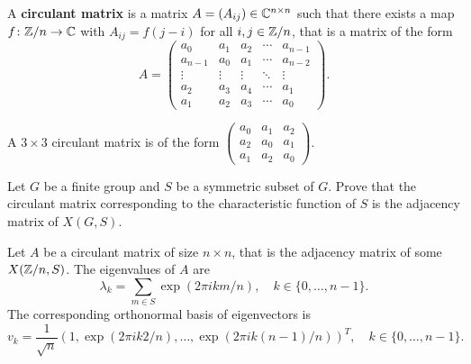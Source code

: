 \begin{definition}
  A \textbf{circulant matrix} is a matrix $A=(A_{ij})\in\mathbb{C}^{n\times n}$ 
  such that there exists a map $f\colon\mathbb{Z}/n\to\mathbb{C}$ with   
  $A_{ij}=f(j-i)$ for all $i,j\in\mathbb{Z}/n$, that is a matrix of the form 
  \[
	A=\begin{pmatrix}
	  a_0 & a_1 & a_2 & \cdots & a_{n-1}\\
	  a_{n-1} & a_0 & a_1 & \cdots &a_{n-2}\\
	  \vdots & \vdots & \vdots & \ddots & \vdots\\
	  a_2 & a_3 & a_4 & \cdots & a_1\\
	  a_1 & a_2 & a_3 & \cdots & a_{0}
	\end{pmatrix}.
  \]
\end{definition}

  \begin{example}
    A $3\times 3$ circulant matrix is of the form $
	\begin{pmatrix}
	  a_0 & a_1 & a_2\\
	  a_2 & a_0 & a_1\\
	  a_1 & a_2 & a_0
	\end{pmatrix}$.
  \end{example}

\begin{exercise}
  Let $G$ be a finite group and $S$ be a symmetric subset of $G$. Prove that 
  the circulant matrix corresponding to the characteristic function 
  of $S$ is the adjacency matrix of $X(G,S)$.
\end{exercise}

\begin{corollary}
  Let $A$ be a circulant matrix of size $n\times n$, that is the adjacency matrix 
  of some $X(\mathbb{Z}/n,S)$. The eigenvalues of $A$ are
  \[
    \lambda_k=\sum_{m\in S}\exp(2\pi ikm/n),\quad
    k\in\{0,\dots,n-1\}.
  \]
    The corresponding orthonormal basis of eigenvectors is  
  \[
    v_k=\frac{1}{\sqrt{n}}(1,\exp(2\pi ik2/n),\dots,\exp(2\pi ik(n-1)/n))^T,\quad k\in\{0,\dots,n-1\}.
  \]
\end{corollary}

